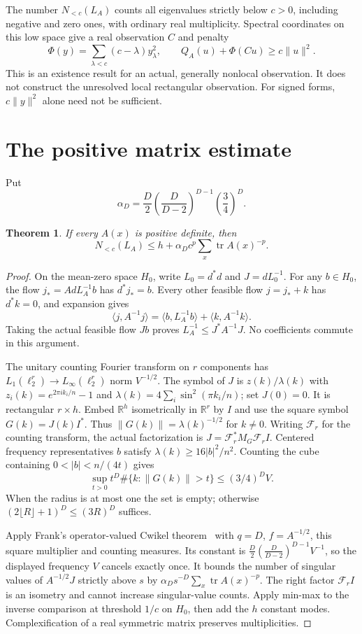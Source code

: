 \documentclass[11pt,a4paper]{article}
\newtheorem{theorem}{Theorem}
\newcommand{\R}{\mathbb R}
\newcommand{\tr}{\operatorname{tr}}
\newcommand{\Nlow}{N_{<c}}
\begin{document}
The number $\Nlow(L_A)$ counts all eigenvalues strictly below $c>0$,
including negative and zero ones, with ordinary real multiplicity. Spectral
coordinates on this low space give a real observation $C$ and penalty
\begin{equation}\label{eq:penalty}
 \Phi(y)=\sum_{\lambda<c}(c-\lambda)y_\lambda^2,
 \qquad Q_A(u)+\Phi(Cu)\geq c\|u\|^2.
\end{equation}
This is an existence result for an actual, generally nonlocal observation.
It does not construct the unresolved local rectangular observation.
For signed forms, $c\|y\|^2$ alone need not be sufficient.

\section{The positive matrix estimate}
Put
\[
 \alpha_D=\frac D2\left(\frac D{D-2}\right)^{D-1}
                 \left(\frac34\right)^D.
\]
\begin{theorem}\label{thm:positive}
If every $A(x)$ is positive definite, then
\begin{equation}\label{eq:positive}
 \Nlow(L_A)\leq h+\alpha_D c^p\sum_x\tr A(x)^{-p}.
\end{equation}
\end{theorem}
\begin{proof}
On the mean-zero space $H_0$, write $L_0=d^*d$ and $J=dL_0^{-1}$.
For any $b\in H_0$, the flow $j_*=A dL_A^{-1}b$ has $d^*j_*=b$.
Every other feasible flow $j=j_*+k$ has $d^*k=0$, and expansion gives
\[
 \langle j,A^{-1}j\rangle
 =\langle b,L_A^{-1}b\rangle+\langle k,A^{-1}k\rangle.
\]
Taking the actual feasible flow $Jb$ proves
$L_A^{-1}\leq J^*A^{-1}J$. No coefficients commute in this argument.

The unitary counting Fourier transform on $r$ components has
$L_1(\ell_2^r)\to L_\infty(\ell_2^r)$ norm $V^{-1/2}$. The symbol of $J$
is $z(k)/\lambda(k)$ with
$z_i(k)=e^{2\pi i k_i/n}-1$ and
$\lambda(k)=4\sum_i\sin^2(\pi k_i/n)$; set $J(0)=0$.
It is rectangular $r\times h$. Embed $\R^h$ isometrically in $\R^r$ by $I$
and use the square symbol $G(k)=J(k)I^*$. Thus $\|G(k)\|=\lambda(k)^{-1/2}$
for $k\ne0$. Writing $\mathcal F_r$ for the counting transform, the actual
factorization is $J=\mathcal F_r^*M_G\mathcal F_r I$.
Centered frequency representatives $b$ satisfy
$\lambda(k)\geq16|b|^2/n^2$. Counting the cube containing
$0<|b|<n/(4t)$ gives
\[
 \sup_{t>0}t^D\#\{k:\|G(k)\|>t\}\leq(3/4)^D V.
\]
When the radius is at most one the set is empty; otherwise
$(2\lfloor R\rfloor+1)^D\leq(3R)^D$ suffices.

Apply Frank's operator-valued Cwikel theorem~\cite[Theorem 3.1]{Frank}
with $q=D$, $f=A^{-1/2}$, this square multiplier and counting measures.
Its constant is $\frac D2(\frac D{D-2})^{D-1}V^{-1}$, so the displayed
frequency $V$ cancels exactly once. It bounds the number of singular values
of $A^{-1/2}J$ strictly above $s$ by
$\alpha_Ds^{-D}\sum_x\tr A(x)^{-p}$. The right factor $\mathcal F_r I$ is an isometry
and cannot increase singular-value counts. Apply min-max to the inverse
comparison at threshold $1/c$ on $H_0$, then add the $h$ constant modes.
Complexification of a real symmetric matrix preserves multiplicities.
\end{proof}
\end{document}

